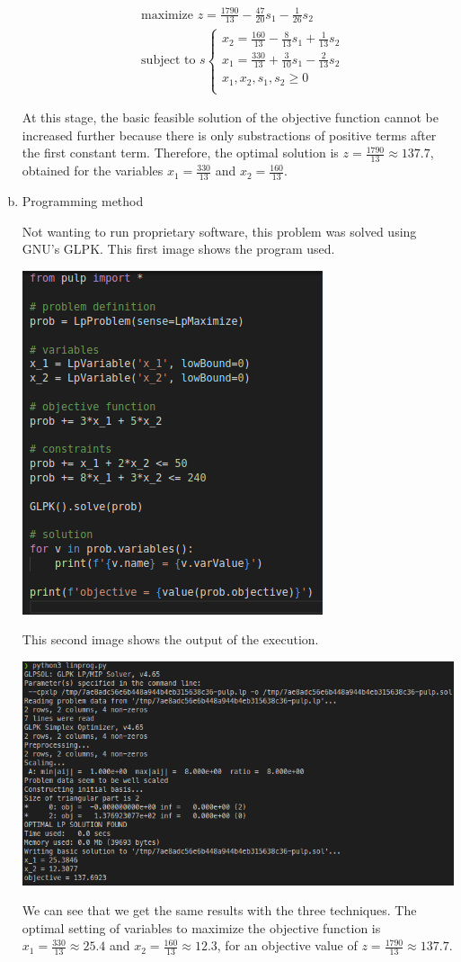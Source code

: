 \documentclass[a4paper, 10pt, twoside]{article}
\begin{document}
\begin{enumerate}[a)]
          \begin{align*}
               & \text{maximize } z = \frac{1790}{13} - \frac{47}{20}s_1 - \frac{1}{26}s_2 \\
               & \text{subject to }s
              \begin{cases}
                  x_2 = \frac{160}{13}-\frac{8}{13}s_1+\frac{1}{13}s_2 \\
                  x_1=\frac{330}{13}+\frac{3}{10}s_1-\frac{2}{13}s_2   \\
                  x_1, x_2, s_1, s_2 \ge 0                             \\
              \end{cases}
          \end{align*}

          At this stage, the basic feasible solution of the objective function cannot be increased further because there is only substractions of positive terms after the first constant term. Therefore, the optimal solution is $z = \frac{1790}{13} \approx 137.7$, obtained for the variables $x_1 = \frac{330}{13}$ and $x_2 = \frac{160}{13}$.

    \item Programming method

          Not wanting to run proprietary software, this problem was solved using GNU's GLPK.
          This first image shows the program used.
          \begin{center}
              \includegraphics[width = .5 \textwidth]{linprog_script.png}
          \end{center}
          This second image shows the output of the execution.
          \begin{center}
            \includegraphics[width = .5 \textwidth]{linprog_run.png}
          \end{center}

    We can see that we get the same results with the three techniques. The optimal setting of variables to maximize the objective function is $x_1 = \frac{330}{13} \approx 25.4$ and $x_2 = \frac{160}{13} \approx 12.3$, for an objective value of $z = \frac{1790}{13} \approx 137.7.$
\end{enumerate}
\end{document}
